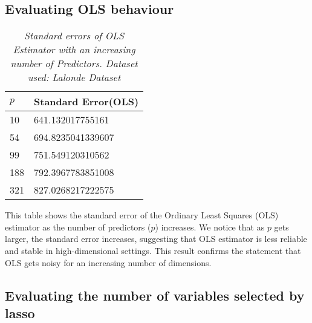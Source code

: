 % 




\subsection{Evaluating OLS behaviour}
\begin{table}[h!]
\renewcommand{\arraystretch}{1.5}
\centering
\begin{tabular}{||l l||} 
 \hline
 \hline
 $p$ & Standard Error(OLS) \\ [0.5ex] 
 \hline\hline
 10 & 641.132017755161 \\ 
 54 & 694.8235041339607  \\
 99 & 751.549120310562 \\ 
 188 & 792.3967783851008 \\ 
 321 & 827.0268217222575 \\[1ex] 
 \hline
\end{tabular}
\caption{\textit{Standard errors of OLS Estimator with an increasing number of Predictors. Dataset used: Lalonde Dataset}}
\label{table:1}
\end{table}
This table shows the standard error of the Ordinary Least Squares (OLS) estimator as the number of predictors ($p$) increases. We notice that as $p$ gets larger, the standard error increases, suggesting that OLS estimator is less reliable and stable in high-dimensional settings. This result confirms the statement that OLS gets noisy for an increasing number of dimensions. 

\subsection{Evaluating the number of variables selected by lasso}

